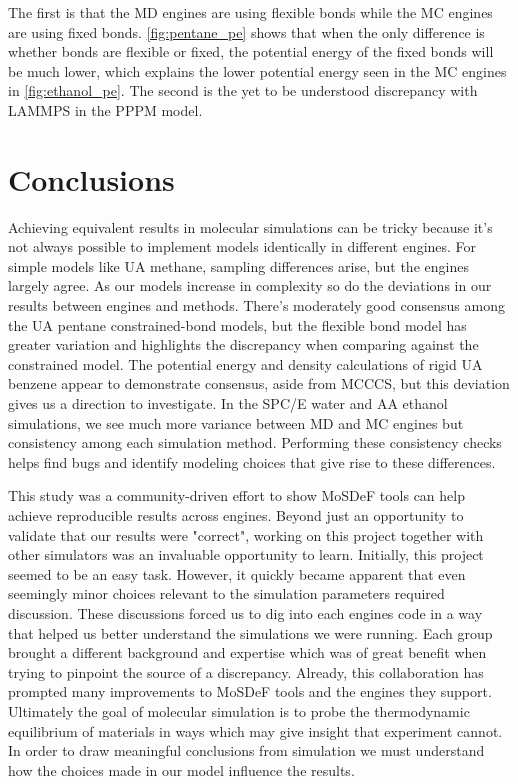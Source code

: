 The first is that the MD engines are using flexible bonds while the MC engines are using fixed bonds.
\autoref{fig:pentane_pe} shows that when the only difference is whether bonds are flexible or fixed, the potential energy of the fixed bonds will be much lower, which explains the lower potential energy seen in the MC engines in \autoref{fig:ethanol_pe}.
The second is the yet to be understood discrepancy with LAMMPS in the PPPM model. 

\section{Conclusions}

Achieving equivalent results in molecular simulations can be tricky because it's not always possible to implement models identically in different engines.
For simple models like UA methane, sampling differences arise, but the engines largely agree.
As our models increase in complexity so do the deviations in our results between engines and methods.
There’s moderately good consensus among the UA pentane constrained-bond models, but the flexible bond model has greater variation and highlights the discrepancy when comparing against the constrained model.
The potential energy and density calculations of rigid UA benzene appear to demonstrate consensus, aside from MCCCS, but this deviation gives us a direction to investigate.
In the SPC/E water and AA ethanol simulations, we see much more variance between MD and MC engines but consistency among each simulation method.
Performing these consistency checks helps find bugs and identify modeling choices that give rise to these differences.

This study was a community-driven effort to show MoSDeF tools can help achieve reproducible results across engines.
Beyond just an opportunity to validate that our results were "correct", working on this project together with other simulators was an invaluable opportunity to learn.
Initially, this project seemed to be an easy task. 
However, it quickly became apparent that even seemingly minor choices relevant to the simulation parameters required discussion.
These discussions forced us to dig into each engines code in a way that helped us better understand the simulations we were running.
Each group brought a different background and expertise which was of great benefit when trying to pinpoint the source of a discrepancy.
Already, this collaboration has prompted many improvements to MoSDeF tools and the engines they support.
Ultimately the goal of molecular simulation is to probe the thermodynamic equilibrium of materials in ways which may give insight that experiment cannot.
In order to draw meaningful conclusions from simulation we must understand how the choices made in our model influence the results.